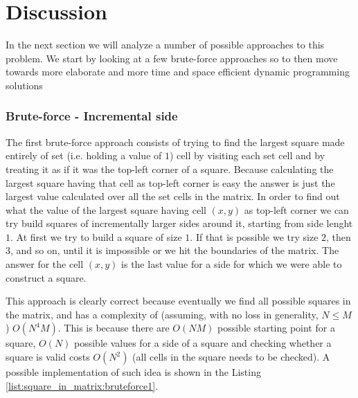 \section{Discussion}
\label{square_in_matrix:sec:discussion}
In the next section we will analyze a number of possible approaches to this problem. We start by
looking at a few brute-force approaches so to then move towards more elaborate and more time and
space efficient dynamic programming solutions

\subsubsection{Brute-force - Incremental side}
\label{square_in_matrix:sec:incremental_side}
The first brute-force approach consists of trying to find the largest square made entirely of
set (i.e. holding a value of $1$) cell by visiting each set cell and by treating it as if it was the top-left corner
of a square. Because calculating the largest square having that cell as top-left corner is easy the
answer is just the largest value calculated over all the set cells in the matrix. In order to find out
what the value of the largest square having cell $(x,y)$ as top-left corner we can
try build squares of incrementally larger sides around it, starting from side lenght $1$.
At first we try to build a square of size $1$. If that is possible we try size $2$, then $3$, and so on, until it is impossible or we hit the boundaries of the matrix.
The answer for the cell $(x,y)$ is the last value for a side for which we were able to construct a square.

This approach is clearly correct because eventually we find all possible squares in the matrix, and has a
complexity of (assuming, with no loss in generality, $N \leq M$) $O(N^4M)$. This is because there are $O(NM)$ possible starting point for
a square, $O(N)$ possible values for a side of a square and checking whether a square is
valid costs $O(N^2)$ (all cells in the square needs to be checked). A possible implementation of such idea is
shown in the Listing \ref{list:square_in_matrix:bruteforce1}.





